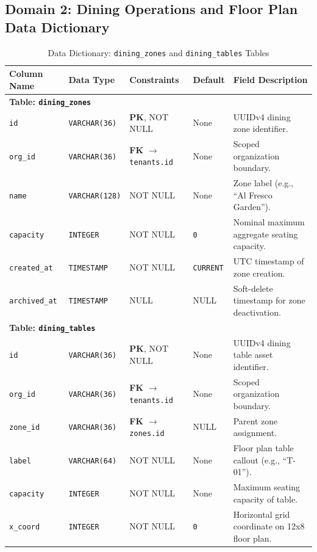 \subsection{Domain 2: Dining Operations and Floor Plan Data Dictionary}

\begin{table}[htbp]
\centering
\caption{Data Dictionary: \texttt{dining\_zones} and \texttt{dining\_tables} Tables}
\label{tab:dict_dining_topology}
\small
\begin{tabularx}{\textwidth}{llp{3.2cm}lX}
\toprule
\textbf{Column Name} & \textbf{Data Type} & \textbf{Constraints} & \textbf{Default} & \textbf{Field Description} \\
\midrule
\multicolumn{5}{l}{\textbf{Table: \texttt{dining\_zones}}} \\
\texttt{id} & \texttt{VARCHAR(36)} & \textbf{PK}, NOT NULL & None & UUIDv4 dining zone identifier. \\
\texttt{org\_id} & \texttt{VARCHAR(36)} & \textbf{FK} $\to$ \texttt{tenants.id} & None & Scoped organization boundary. \\
\texttt{name} & \texttt{VARCHAR(128)} & NOT NULL & None & Zone label (e.g., ``Al Fresco Garden''). \\
\texttt{capacity} & \texttt{INTEGER} & NOT NULL & \texttt{0} & Nominal maximum aggregate seating capacity. \\
\texttt{created\_at} & \texttt{TIMESTAMP} & NOT NULL & \texttt{CURRENT} & UTC timestamp of zone creation. \\
\texttt{archived\_at}& \texttt{TIMESTAMP} & NULL & NULL & Soft-delete timestamp for zone deactivation. \\
\midrule
\multicolumn{5}{l}{\textbf{Table: \texttt{dining\_tables}}} \\
\texttt{id} & \texttt{VARCHAR(36)} & \textbf{PK}, NOT NULL & None & UUIDv4 dining table asset identifier. \\
\texttt{org\_id} & \texttt{VARCHAR(36)} & \textbf{FK} $\to$ \texttt{tenants.id} & None & Scoped organization boundary. \\
\texttt{zone\_id} & \texttt{VARCHAR(36)} & \textbf{FK} $\to$ \texttt{zones.id} & NULL & Parent zone assignment. \\
\texttt{label} & \texttt{VARCHAR(64)} & NOT NULL & None & Floor plan table callout (e.g., ``T-01''). \\
\texttt{capacity} & \texttt{INTEGER} & NOT NULL & None & Maximum seating capacity of table. \\
\texttt{x\_coord} & \texttt{INTEGER} & NOT NULL & \texttt{0} & Horizontal grid coordinate on 12x8 floor plan. \\

\end{tabularx}
\end{table}
